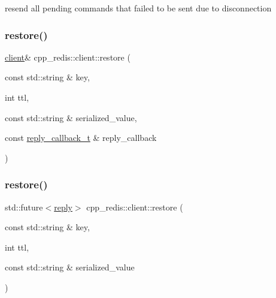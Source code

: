 resend all pending commands that failed to be sent due to disconnection \mbox{\label{classcpp__redis_1_1client_a3598f781ae048b03edcdb07e8d2c0f41}} 
\subsubsection{\texorpdfstring{restore()}{restore()}\hspace{0.1cm}{\footnotesize\ttfamily [1/4]}}
{\footnotesize\ttfamily \hyperlink{classcpp__redis_1_1client}{client}\& cpp\+\_\+redis\+::client\+::restore (\begin{DoxyParamCaption}\item[{const std\+::string \&}]{key,  }\item[{int}]{ttl,  }\item[{const std\+::string \&}]{serialized\+\_\+value,  }\item[{const \hyperlink{classcpp__redis_1_1client_a061a1140d36d2eaeda82b09a0bb3f9f2}{reply\+\_\+callback\+\_\+t} \&}]{reply\+\_\+callback }\end{DoxyParamCaption})}

\mbox{\label{classcpp__redis_1_1client_a5b7a7d7de93268198f27cd21f63ba337}} 
\subsubsection{\texorpdfstring{restore()}{restore()}\hspace{0.1cm}{\footnotesize\ttfamily [2/4]}}
{\footnotesize\ttfamily std\+::future$<$\hyperlink{classcpp__redis_1_1reply}{reply}$>$ cpp\+\_\+redis\+::client\+::restore (\begin{DoxyParamCaption}\item[{const std\+::string \&}]{key,  }\item[{int}]{ttl,  }\item[{const std\+::string \&}]{serialized\+\_\+value }\end{DoxyParamCaption})}

\mbox{\label{classcpp__redis_1_1client_a5ebff3760403ee7d031083f185792780}} 
